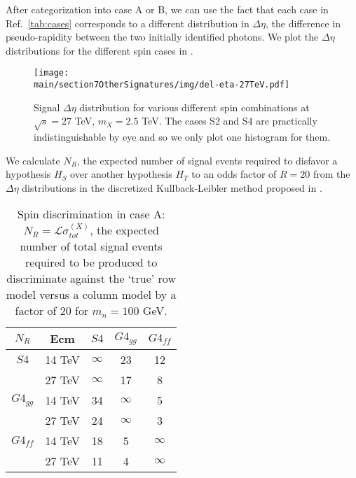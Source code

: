 After categorization into case A or B, we can use the fact that
each case in Ref.~\ref{tab:cases} corresponds to a different distribution in $\Delta \eta$, the difference in pseudo-rapidity between the two initially identified photons.
We plot the $\Delta \eta$ distributions for the different spin cases in . 
\begin{figure}
\begin{center}
\texttt{[image: \\main/section7OtherSignatures/img/del-eta-27TeV.pdf]}
\caption{Signal $\Delta \eta$ distribution for various different spin combinations at $\sqrt{s}=27$ TeV, $m_X=2.5$ TeV. The cases S2 and S4 are practically indistinguishable by eye and so we only plot one histogram for them. \label{fig:deta}}
\end{center}
\end{figure}
We calculate $N_R$, the expected number of signal events required to disfavor a hypothesis $H_S$ over another hypothesis $H_T$ to an odds factor of $R=20$ from the $\Delta \eta$ distributions in the 
discretized Kullback-Leibler 
method proposed in .
\begin{table}[h!]
	\begin{center}
		\begin{tabular}{|c|c|c|c|c|} 
			\hline
			
			$N_R$  & Ecm         & $S4$   & $G4_{gg}$ &  $G4_{ff}$ \\ \hline
			\hline
			
			$S4$   & 14 TeV       &$\infty$&23&12\\    
			& {27 TeV} &$\infty$&17&8 \\ \hline \hline
			
			$G4_{gg}$  & 14 TeV   &34&$\infty$&5\\  
	&{27 TeV}			 &24&$\infty$&3\\ \hline \hline 
			$G4_{ff}$ & 14 TeV    &18&5&$\infty$ \\  
			& {27 TeV} &11&4&$\infty$ \\ \hline  \hline    
		\end{tabular}
		\caption{\label{tab:tab:spindiscrimination1lambda} Spin discrimination in case A: $N_R = {\mathcal L}
			\sigma_{tot}^{(X)}$, the expected
			number of total signal events required to be produced 
			to discriminate against the `true' row
			model versus a column model by a factor of 20
			for $m_n=100$ GeV.} 
	\end{center}
\end{table}
